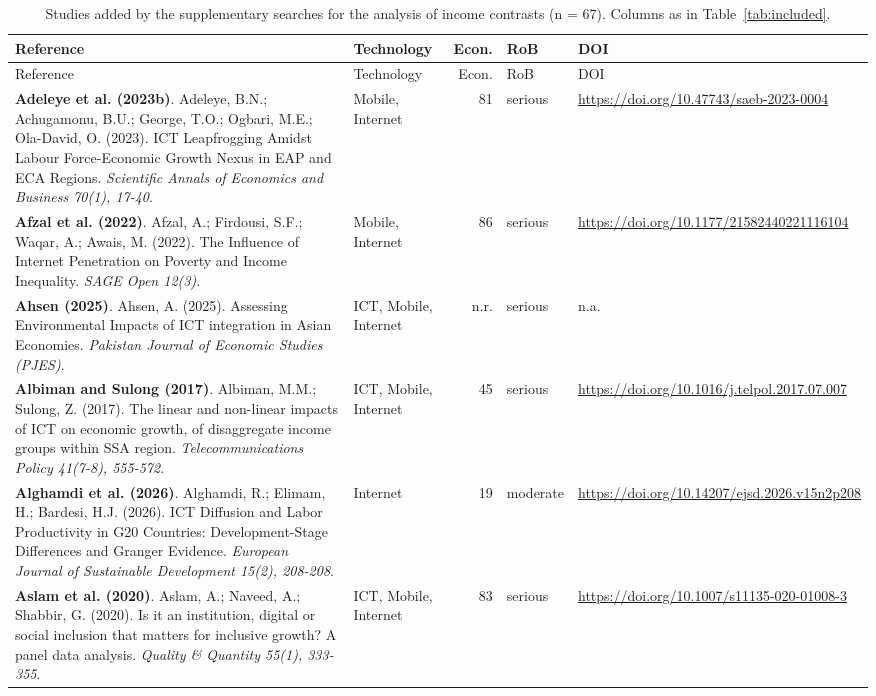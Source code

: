 {\scriptsize
\begin{longtable}{@{}p{7.4cm} p{1.3cm} r l p{3.4cm}@{}}
\caption{Studies added by the supplementary searches for the analysis of income contrasts (n = 67). Columns as in Table~\ref{tab:included}.}\label{tab:included2}\\
\toprule Reference & Technology & Econ. & RoB & DOI \\ \midrule \endfirsthead
\toprule Reference & Technology & Econ. & RoB & DOI \\ \midrule \endhead
\bottomrule \endfoot
\textbf{Adeleye et al. (2023b)}. Adeleye, B.N.; Achugamonu, B.U.; George, T.O.; Ogbari, M.E.; Ola-David, O. (2023). ICT Leapfrogging Amidst Labour Force-Economic Growth Nexus in EAP and ECA Regions. \emph{Scientific Annals of Economics and Business 70(1), 17-40}. & Mobile, Internet & 81 & serious & \url{https://doi.org/10.47743/saeb-2023-0004} \\
\textbf{Afzal et al. (2022)}. Afzal, A.; Firdousi, S.F.; Waqar, A.; Awais, M. (2022). The Influence of Internet Penetration on Poverty and Income Inequality. \emph{SAGE Open 12(3)}. & Mobile, Internet & 86 & serious & \url{https://doi.org/10.1177/21582440221116104} \\
\textbf{Ahsen (2025)}. Ahsen, A. (2025). Assessing Environmental Impacts of ICT integration in Asian Economies. \emph{Pakistan Journal of Economic Studies (PJES)}. & ICT, Mobile, Internet & n.r. & serious & n.a. \\
\textbf{Albiman and Sulong (2017)}. Albiman, M.M.; Sulong, Z. (2017). The linear and non-linear impacts of ICT on economic growth, of disaggregate income groups within SSA region. \emph{Telecommunications Policy 41(7-8), 555-572}. & ICT, Mobile, Internet & 45 & serious & \url{https://doi.org/10.1016/j.telpol.2017.07.007} \\
\textbf{Alghamdi et al. (2026)}. Alghamdi, R.; Elimam, H.; Bardesi, H.J. (2026). ICT Diffusion and Labor Productivity in G20 Countries: Development-Stage Differences and Granger Evidence. \emph{European Journal of Sustainable Development 15(2), 208-208}. & Internet & 19 & moderate & \url{https://doi.org/10.14207/ejsd.2026.v15n2p208} \\
\textbf{Aslam et al. (2020)}. Aslam, A.; Naveed, A.; Shabbir, G. (2020). Is it an institution, digital or social inclusion that matters for inclusive growth? A panel data analysis. \emph{Quality \& Quantity 55(1), 333-355}. & ICT, Mobile, Internet & 83 & serious & \url{https://doi.org/10.1007/s11135-020-01008-3} \\

\end{longtable}}
